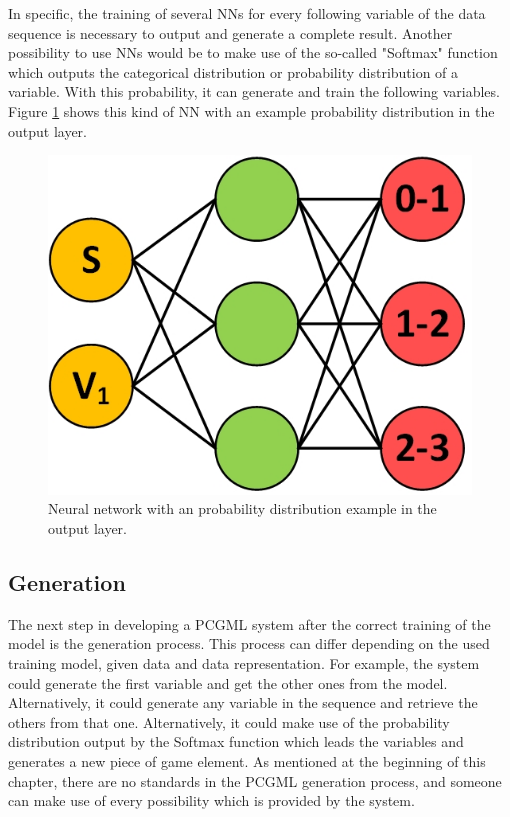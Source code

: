 \documentclass[MGS,Master,english]{twbook}%
\begin{document}
In specific, the training of several \acp{NN} for every following variable of the data sequence is necessary to output and generate a complete result. Another possibility to use \acp{NN} would be to make use of the so-called "Softmax" function which outputs the categorical distribution or probability distribution of a variable. With this probability, it can generate and train the following variables. Figure \ref{fig::PCGML::devExample::NNwithSoftmax} shows this kind of NN with an example probability distribution in the output layer.
\begin{figure}[!htbp]
	\centering
	\includegraphics[width=0.3\linewidth]{PICs/NNs/PCGML_development_example_NN_categorical_distributions}
	\caption{Neural network with an probability distribution example in the output layer.}\label{fig::PCGML::devExample::NNwithSoftmax}
\end{figure}


\subsection{Generation}
The next step in developing a PCGML system after the correct training of the model is the generation process. This process can differ depending on the used training model, given data and data representation. For example, the system could generate the first variable and get the other ones from the model. Alternatively, it could generate any variable in the sequence and retrieve the others from that one. Alternatively, it could make use of the probability distribution output by the Softmax function which leads the variables and generates a new piece of game element. As mentioned at the beginning of this chapter, there are no standards in the PCGML generation process, and someone can make use of every possibility which is provided by the system.
 
%
%
\clearpage
\end{document}
